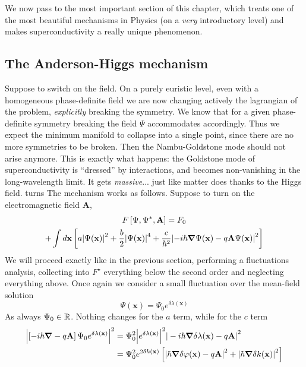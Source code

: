 We now pass to the most important section of this chapter, which treats one of the most beautiful mechanisms in Physics (on a \textit{very} introductory level) and makes superconductivity a really unique phenomenon.

\subsection{The Anderson-Higgs mechanism}

Suppose to switch on the field. On a purely euristic level, even with a homogeneous phase-definite field we are now changing actively the lagrangian of the problem, \textit{explicitly} breaking the symmetry. We know that for a given phase-definite symmetry breaking the field $\Psi$ accommodates accordingly. Thus we expect the minimum manifold to collapse into a single point, since there are no more symmetries to be broken. Then the Nambu-Goldstone mode should not arise anymore. This is exactly what happens: the Goldstone mode of superconductivity is ``dressed'' by interactions, and becomes non-vanishing in the long-wavelength limit. It gets \textit{massive}... just like matter does thanks to the Higgs field.
turns
The mechanism works as follows. Suppose to turn on the electromagnetic field $\mathbf{A}$,
\begin{multline*}
    F \left[{ \Psi,\Psi^*,\mathbf{A}}\right] = F_0 \\
    + \int d\mathbf{x} \left[{
        a \abs{\Psi(\mathbf{x}) }^2 + \frac{b}{2} \abs{ \Psi(\mathbf{x}) }^4 + \frac{c}{\hbar^2} \abs{-i\hbar\grad \Psi(\mathbf{x}) - q \mathbf{A} \Psi(\mathbf{x}) }^2
    }\right]
\end{multline*}
We will proceed exactly like in the previous section, performing a fluctuations analysis, collecting into $F^\star$ everything below the second order and neglecting everything above. Once again we consider a small fluctuation over the mean-field solution
\[
    \Psi(\mathbf{x}) = \Psi_0 e^{\delta \lambda (\mathbf{x})}
\]
As always $\Psi_0 \in \mathbb{R}$. Nothing changes for the $a$ term, while for the $c$ term
\[
\begin{aligned}
    \abs{ \left[{-i \hbar \grad - q \mathbf{A}}\right] \Psi_0 e^{\delta \lambda (\mathbf{x})}}^2 &= \Psi_0^2 \abs{e^{\delta \lambda (\mathbf{x})}}^2 \abs{ \vphantom{A'} -i\hbar \grad \delta \lambda(\mathbf{x}) - q \mathbf{A} }^2 \\
    &= \Psi_0^2 e^{2\delta k(\mathbf{x})} \left[{ \abs{\hbar \grad \delta \varphi (\mathbf{x}) - q \mathbf{A}}^2 + \abs{\hbar \grad \delta k(\mathbf{x})}^2 }\right]
\end{aligned}
\]
